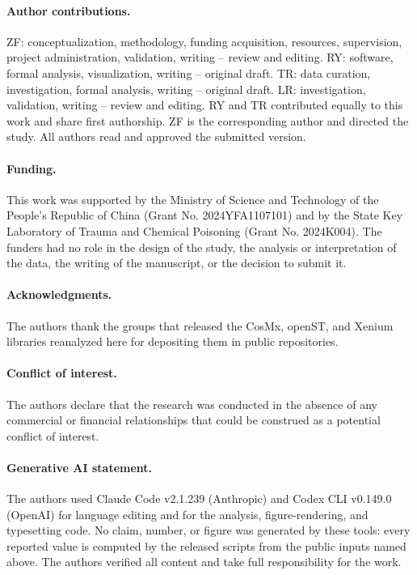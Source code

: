 \paragraph{Author contributions.}
ZF: conceptualization, methodology, funding acquisition, resources, supervision, project
administration, validation, writing -- review and editing. RY: software, formal analysis, visualization,
writing -- original draft. TR: data curation, investigation, formal analysis, writing --
original draft. LR:
investigation, validation, writing -- review and editing. RY and TR contributed equally to
this work and share first authorship. ZF is the corresponding author and directed the study. All authors
read and approved the submitted version.

\paragraph{Funding.}
This work was supported by the Ministry of Science and Technology of the People's Republic
of China (Grant No. 2024YFA1107101) and by the State Key Laboratory of Trauma and
Chemical Poisoning (Grant No. 2024K004). The funders had no role in the design of the
study, the analysis or interpretation of the data, the writing of the manuscript, or the
decision to submit it.

\paragraph{Acknowledgments.}
The authors thank the groups that released the CosMx, openST, and Xenium libraries
reanalyzed here for depositing them in public repositories.

\paragraph{Conflict of interest.}
The authors declare that the research was conducted in the absence of any commercial or
financial relationships that could be construed as a potential conflict of interest.

\paragraph{Generative AI statement.}
The authors used Claude Code v2.1.239 (Anthropic) and Codex CLI v0.149.0 (OpenAI) for
language editing and for the analysis, figure-rendering, and typesetting code. No claim,
number, or figure was generated by these tools: every reported value is computed by the
released scripts from the public inputs named above. The authors verified all content and
take full responsibility for the work.

